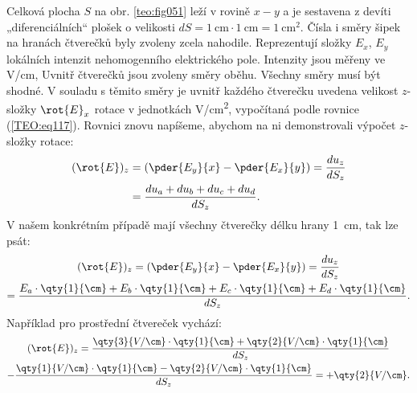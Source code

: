 \begin{mdframed}[style=mdexam]
\begin{example}\label{TEO:exam014}
  Celková plocha \(S\) na obr. \ref{teo:fig051} leží v rovině \(x-y\) a je 
  sestavena z devíti „diferenciálních“ plošek o velikosti \(dS = \qty{1}{\cm} \cdot \qty{1}{\cm} = 
  \qty{1}{\cm^2}\). Čísla i směry šipek na hranách čtverečků byly zvoleny zcela nahodile. 
  Reprezentují složky \(E_x\), \(E_y\) lokálních intenzit nehomogenního elektrického pole. 
  Intenzity jsou měřeny ve \unit{V/\cm}, Uvnitř čtverečků jsou zvoleny směry oběhu. Všechny směry 
  musí být shodné. V souladu s těmito směry je uvnitř každého čtverečku uvedena velikost 
  \(z\)-složky \(\rot{E}_x\) rotace v jednotkách \unit{V/\cm^2}, vypočítaná podle rovnice 
  (\ref{TEO:eq117}). Rovnici znovu napíšeme, abychom na ni demonstrovali výpočet 
  \(z\)-složky rotace:
  \begin{align*}
    (\rot{E})_z   &= \left(\pder{E_y}{x} - \pder{E_x}{y}\right)                  
                  = \frac{du_z}{dS_z}                             \\
                  &= \frac{du_a + du_b + du_c + du_d}{dS_z}.
  \end{align*}
  V našem konkrétním případě mají všechny čtverečky délku hrany \qty{1}{\cm}, tak lze psát:
  \begin{multline*}
    (\rot{E})_z = \left(\pder{E_y}{x} - \pder{E_x}{y}\right)
                = \frac{du_z}{dS_z}                                          \\
                = \frac{E_a\cdot\qty{1}{\cm} + E_b\cdot\qty{1}{\cm} + 
                    E_c\cdot\qty{1}{\cm} + E_d\cdot\qty{1}{\cm}}{dS_z}.
  \end{multline*}
  Například pro prostřední čtvereček vychází:
  \begin{multline*}
    (\rot{E})_z 
      = \frac{\qty{3}{V/\cm}\cdot\qty{1}{\cm} + \qty{2}{V/\cm}\cdot\qty{1}{\cm}}{dS_z}  \\
      - \frac{\qty{1}{V/\cm}\cdot\qty{1}{\cm} - \qty{2}{V/\cm}\cdot\qty{1}{\cm}}{dS_z} 
      = + \qty{2}{V/\cm}.
  \end{multline*}
  
   {\centering
    \captionsetup{type=figure}
    \label{teo:fig051}
  \par}
  

\end{example}
\end{mdframed}
